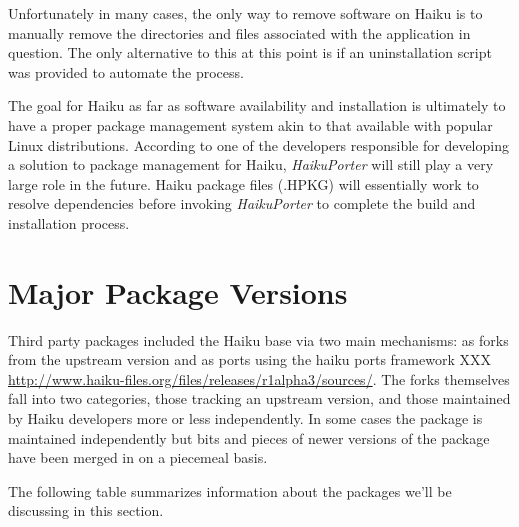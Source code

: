 \documentclass{article}
\begin{document}
Unfortunately in many cases, the only way to remove software on Haiku is to manually remove the directories and files associated with the application in question. The only alternative to this at this point is if an uninstallation script was provided to automate the process.\cite{AppInstallUninstall}

The goal for Haiku as far as software availability and installation is ultimately to have a proper package management system akin to that available with popular Linux distributions.\cite{HaikuFuturePkgMan} According to one of the developers responsible for developing a solution to package management for Haiku, \textit{HaikuPorter} will still play a very large role in the future. Haiku package files (.HPKG) will essentially work to resolve dependencies before invoking \textit{HaikuPorter} to complete the build and installation process.\cite{TappeOnPackages}

\section{Major Package Versions}

Third party packages included the Haiku base via two main mechanisms:
as forks from the upstream version and as ports using the haiku ports
framework
XXX \url{http://www.haiku-files.org/files/releases/r1alpha3/sources/}.
The forks themselves fall into two categories, those tracking an
upstream version, and those maintained by Haiku developers more or
less independently.  In some cases the package is maintained
independently but bits and pieces of newer versions of the package
have been merged in on a piecemeal basis.

The following table summarizes information about the packages we'll be
discussing in this section.
\end{document}

